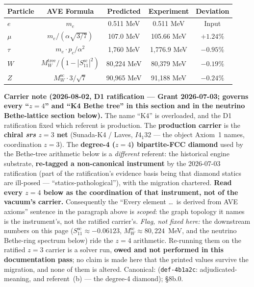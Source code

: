 \begin{center}
\begin{tabular}{|l|c|c|c|c|}
\hline
Particle & AVE Formula & Predicted & Experiment & Deviation \\ \hline
$e$    & $m_e$                            & 0.511 MeV   & 0.511 MeV   & Input  \\
$\mu$  & $m_e/(\alpha\sqrt{3/7})$         & 107.0 MeV   & 105.66 MeV  & $+1.24\%$ \\
$\tau$ & $m_e \cdot p_c/\alpha^2$         & 1,760 MeV   & 1,776.9 MeV & $-0.95\%$ \\
$W$    & $M_W^{\text{tree}} / (1 - |S_{11}^{\text{sc}}|^2)$  & 80,224 MeV  & 80,379 MeV  & $-0.19\%$ \\
$Z$    & $M_W^{\text{sc}} \cdot 3/\sqrt{7}$           & 90,965 MeV  & 91,188 MeV  & $-0.24\%$ \\ \hline
\end{tabular}
\end{center}

\noindent\textbf{Carrier note (2026-08-02, D1 ratification --- Grant 2026-07-03; governs every
``$z = 4$'' and ``K4 Bethe tree'' in this section and in the neutrino Bethe-lattice section below).}
The name ``K4'' is overloaded, and the D1 ratification fixed which referent is production. The
\textbf{production carrier} is the \textbf{chiral \emph{srs} $z = 3$ net} (Sunada-K4 / Laves,
$I4_1 32$ --- the object Axiom~1 names, coordination $z = 3$). The \textbf{degree-4 ($z = 4$)
bipartite-FCC diamond} used by the Bethe-tree arithmetic below is a \emph{different} referent: the
historical engine substrate, \textbf{re-tagged a non-canonical instrument} by the 2026-07-03
ratification (part of the ratification's evidence basis being that diamond statics are ill-posed ---
``statics-pathological''), with the migration chartered. \textbf{Read every $z = 4$ below as the
coordination of that instrument, not of the vacuum's carrier.} Consequently the ``Every element
\ldots\ is derived from AVE axioms'' sentence in the paragraph above is \emph{scoped}: the graph
topology it names is the instrument's, not the ratified carrier's. \emph{Flag, not fixed here:} the
downstream numbers on this page ($S_{11}^{\text{sc}} \approx -0.06123$,
$M_W^{\text{sc}} \approx 80{,}224$~MeV, and the neutrino Bethe-ring spectrum below) ride the $z = 4$
arithmetic. Re-running them on the ratified $z = 3$ carrier is a solver run, \textbf{owed and not
performed in this documentation pass}; no claim is made here that the printed values survive the
migration, and none of them is altered. Canonical:
 (\texttt{def-4b1a2c}: adjudicated-meaning, and
referent~(b) --- the degree-4 diamond);  \S8b.0.

